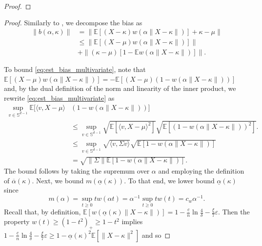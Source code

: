 \documentclass{article}
\theoremstyle{plain}
\theoremstyle{definition}
\begin{document}
\begin{appendix}
\begin{proof}
\end{proof}
\begin{proof}
  Similarly to , we decompose the bias as
		\begin{align}
			\lVert b(\alpha,\kappa )\rVert & =  \lVert \mathbb{E}[(X-\kappa)w(\alpha \lVert X-\kappa\rVert)]+\kappa-\mu\rVert\nonumber \\
  & \leq \lVert\mathbb{E}[(X-\mu)w(\alpha \lVert X-\kappa\rVert)]\rVert\label{eq:est_bias_multivariate} \\
  &+ \lVert (\kappa-\mu)[1-\mathbb{E} w(\alpha \lVert X-\kappa\rVert)]\rVert\label{eq:kappa_bias_multivariate}.
		\end{align}

		To bound \eqref{eq:est_bias_multivariate}, note that
    $\mathbb{E}[(X-\mu)w(\alpha \lVert X-\kappa\rVert)] = - \mathbb{E}[(X-\mu)(1-w(\alpha \lVert X-\kappa\rVert))]$ and, by the dual definition of the norm and linearity of the inner product, we rewrite \eqref{eq:est_bias_multivariate} as \begin{align*}
      \sup_{v \in \mathbb{S}^{d-1}} \mathbb{E}[\langle v, X-\mu \rangle &(1-w(\alpha \lVert X-\kappa \rVert))] \\&\le \sup_{v \in \mathbb{S}^{d-1}} \sqrt{\mathbb{E}\left[\langle v,X-\mu \rangle^2\right]} \sqrt{\mathbb{E}\left[(1-w(\alpha \lVert X-\kappa \rVert))^2\right]}.\\ 
                                                                                                             & \le \sup_{v \in \mathbb{S}^{d-1}}\sqrt{\langle v, \Sigma v \rangle} \sqrt{\mathbb{E}\left[1-w(\alpha \lVert X-\kappa \rVert)\right]}\\ 
                                                                                                             &= \sqrt{\lVert \Sigma \rVert \mathbb{E}\left[1-w(\alpha \lVert X-\kappa \rVert)\right]}. 
    \end{align*} 
    The bound follows by taking the supremum over \( \alpha  \) and employing the definition of \( \overline{\alpha }(\kappa ) \). 
		Next, we bound $m(\underline{\alpha}(\kappa))$. To that end, we lower bound $\underline{\alpha}(\kappa)$ since
		\begin{equation}\label{eq:m_xp_multivariate}
			m(\alpha)=\sup_{t\ge 0}tw(\alpha t)=\alpha^{-1}\sup_{t\geq0}tw(t)=c_w\alpha^{-1}.
		\end{equation}
    Recall that, by definition, $\mathbb{E}[w(\underline{\alpha}(\kappa)\lVert X-\kappa\rVert)]=1-\frac{\underline{c}}{n}\ln\frac{4}{\delta } - \frac{\xi }{7}\varepsilon $. Then the property $w(t)\geq(1-t^2)_+\geq1-t^2$ implies $1-\frac{\underline{c}}{n}\ln\frac{4}{\delta } -\frac{\xi }{7}\varepsilon \geq 1-\underline{\alpha}(\kappa)^2\mathbb{E}[\lVert X-\kappa\rVert^2]$ and so

\end{proof}
\end{appendix}
\end{document}
